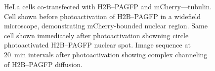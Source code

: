     \begin{figure}
      \centering
      \hfill
        {
          HeLa cells co-transfected with H2B--PAGFP and mCherry--\textalpha--tubulin.
           Cell shown before photoactivation of H2B--PAGFP
          in a widefield microscope, demonstrating mCherry-bounded nuclear region.
           Same cell shown immediately after photoactivation
          showning circle photoactivated H2B--PAGFP nuclear spot.
           Image sequence at 20~min intervals
          after photoactivation showing complex channeling of H2B--PAGFP diffusion.
        }
      \label{fig:kill-frap:ifrap}
    \end{figure}
